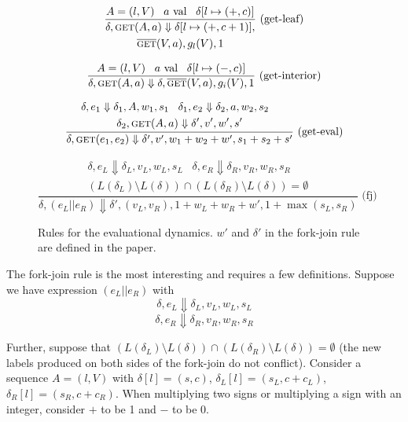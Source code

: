 \begin{figure}[!ht]
$$\frac{A = (l,V) \;\;\; a \text{ val} \;\;\; \delta[l \mapsto (+, c)]}{\begin{gathered}\delta, \text{{\sc get}}{}(A, a) \Downarrow \delta[l \mapsto (+, c+1)], \\ \overline{\mbox{{\sc get}{}}}(V, a), g_l(V), 1\end{gathered}} \text{  (get-leaf)}$$

$$\frac{A = (l,V) \;\;\; a \text{ val} \;\;\; \delta[l \mapsto (-, c)]}{\delta, \text{{\sc get}}{}(A, a) \Downarrow \delta, \overline{\mbox{{\sc get}{}}}(V, a), g_i(V), 1} \text{  (get-interior)}$$

$$\frac{\begin{gathered}\delta, e_1 \Downarrow \delta_1, A, w_1, s_1 \;\;\; \delta_1, e_2 \Downarrow \delta_2, a, w_2, s_2 \;\;\; \\ \delta_2, \text{{\sc get}}{}(A, a) \Downarrow \delta', v', w', s' \end{gathered}}{\delta, \text{{\sc get}}(e_1, e_2) \Downarrow \delta', v', w_1 + w_2 + w', s_1 + s_2 + s'}\text{ (get-eval)}$$

$$\frac{\begin{gathered}\delta, e_L \Downarrow \delta_L, v_L, w_L, s_L \;\;\; \delta, e_R \Downarrow \delta_R, v_R, w_R, s_R \;\;\; \\ (L(\delta_L) \setminus L(\delta)) \cap (L(\delta_R) \setminus L(\delta)) = \emptyset\end{gathered}}{\delta, (e_L || e_R) \Downarrow \delta', (v_L, v_R), 1 + w_L + w_R + w', 1 + \max(s_L, s_R)} \text{  (fj)}$$

\caption{Rules for the evaluational dynamics. $w'$ and $\delta'$ in the fork-join rule are defined in the paper.}
\label{fig:evaluational-dynamics}
\end{figure}

The fork-join rule is the most interesting and requires a few definitions. Suppose we have expression $(e_L || e_R)$ with
\[ \delta, e_L \Downarrow \delta_L, v_L, w_L, s_L \]
\[ \delta, e_R \Downarrow \delta_R, v_R, w_R, s_R \]

Further, suppose that $(L(\delta_L) \setminus L(\delta)) \cap (L(\delta_R) \setminus L(\delta)) = \emptyset$ (the new labels produced on both sides of the fork-join do not conflict). Consider a sequence $A = (l, V)$ with $\delta[l] = (s,c)$, $\delta_L[l] = (s_L, c + c_L)$, $\delta_R[l] = (s_R, c + c_R)$. When multiplying two signs or multiplying a sign with an integer, consider $+$ to be 1 and $-$ to be 0. 

